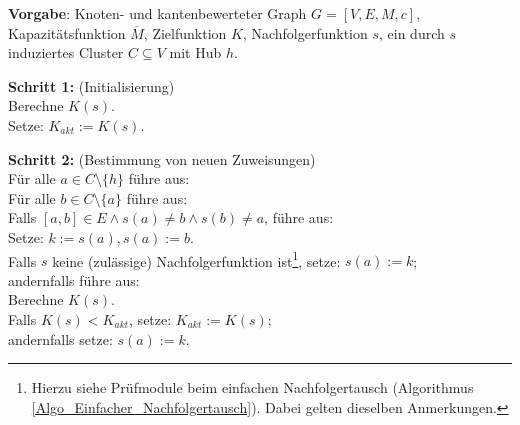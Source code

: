 \begin{algo}
\label{Algo_Mehrfacher_Nachfolgertausch}
\textbf{Vorgabe}: Knoten- und kantenbewerteter Graph $G=[V,E,M,c]$, Kapazitätsfunktion $\overline{M}$, Zielfunktion $K$, Nachfolgerfunktion $s$, ein durch $s$ induziertes Cluster $C \subseteq V$ mit Hub $h$.

\noindent 
\textbf{Schritt 1:} (Initialisierung)\\
\phantom \quad Berechne $K(s)$.\\
\phantom \quad Setze: $K_{akt} := K(s)$.

\noindent 
\textbf{Schritt 2:} (Bestimmung von neuen Zuweisungen)\\
\phantom \quad Für alle $a \in C\setminus \{h\}$ führe aus:\\
\phantom \quad \qquad Für alle $b \in C\setminus\{a\}$ führe aus:\\
\phantom \quad \qquad \qquad Falls $[a,b] \in E \wedge s(a) \neq b \wedge s(b) \neq a$, führe aus:\\
\phantom \quad \qquad \qquad \qquad Setze: $k := s(a), s(a) := b$.\\
\phantom \quad \qquad \qquad \qquad Falls $s$ keine (zulässige) Nachfolgerfunktion ist\footnote{Hierzu siehe Prüfmodule beim einfachen Nachfolgertausch (Algorithmus \ref{Algo_Einfacher_Nachfolgertausch}). Dabei gelten dieselben Anmerkungen.}, setze: $s(a) := k$;\\
\phantom \quad \qquad \qquad \qquad andernfalls führe aus:\\
\phantom \quad \qquad \qquad \qquad \qquad Berechne $K(s)$.\\
\phantom \quad \qquad \qquad \qquad \qquad Falls $K(s) < K_{akt}$, setze: $K_{akt} := K(s)$;\\
\phantom \quad \qquad \qquad \qquad \qquad andernfalls setze: $s(a) := k$.
\end{algo}


